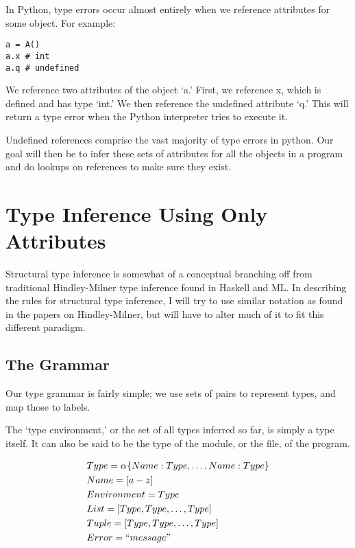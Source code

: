 \documentclass{article}
\begin{document}
In Python, type errors occur almost entirely when we reference attributes for some object. For example:

\begin{verbatim}
a = A()
a.x # int
a.q # undefined
\end{verbatim}

We reference two attributes of the object `a.' First, we reference x, which is
defined and has type `int.' We then reference the undefined attribute `q.' This
will return a type error when the Python interpreter tries to execute it.

Undefined references comprise the vast majority of type errors in python. Our
goal will then be to infer these sets of attributes for all the objects in a
program and do lookups on references to make sure they exist.

\section*{Type Inference Using Only Attributes}

Structural type inference is somewhat of a conceptual branching off from
traditional Hindley-Milner type inference found in Haskell and ML. In
describing the rules for structural type inference, I will try to use similar
notation as found in the papers on Hindley-Milner, but will have to alter much
of it to fit this different paradigm.

\subsection*{The Grammar}

Our type grammar is fairly simple; we use sets of pairs to represent types, and
map those to labels.

The `type environment,' or the set of all types inferred so far, is simply a
type itself. It can also be said to be the type of the module, or the file, of
the program.

\begin{align*}
& Type = \alpha\{ Name : Type, \dots, Name : Type \} \\
& Name = [a-z] \\
& Environment = Type \\
& List = [Type, Type, \dots, Type] \\
& Tuple = [Type, Type, \dots, Type] \\
& Error = ``message"
\end{align*}
\end{document}
